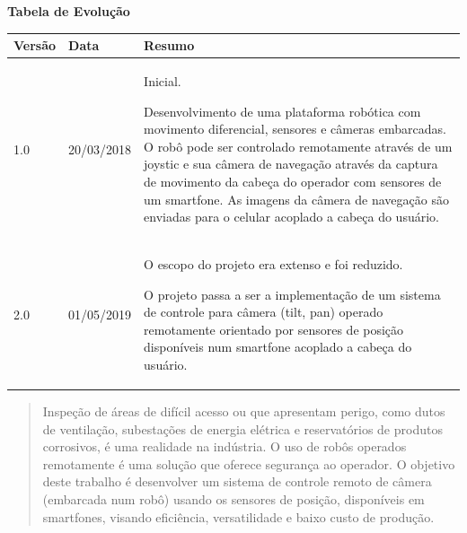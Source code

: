 \documentclass[12pt,a4paper]{article}
\begin{document}
\begin{titlepage}
\begin{center}
\Large{\bf{Tabela de Evolução}}
\end{center}

\begin{center}
    \begin{tabular}{ | l | l | p{10cm} |}
    \hline
    Versão & Data & Resumo \\ \hline
    1.0 & 20/03/2018 & Inicial.\par Desenvolvimento de uma plataforma robótica com movimento diferencial, sensores e câmeras embarcadas. O robô pode ser controlado remotamente através de um joystic e sua câmera de navegação através da captura de movimento da cabeça do operador com sensores de um smartfone. As imagens da câmera de navegação são enviadas para o celular acoplado a cabeça do usuário.\\ \hline
    2.0 & 01/05/2019 & O escopo do projeto era extenso e foi reduzido.\par O projeto passa a ser a implementação de um sistema de controle para câmera (tilt, pan) operado remotamente orientado por sensores de posição disponíveis num smartfone acoplado a cabeça do usuário. \\ \hline
    \end{tabular}
\end{center}

\end{titlepage}



\begin{abstract}
	Inspeção de áreas de difícil acesso ou que apresentam perigo, como dutos de ventilação, subestações de energia elétrica e reservatórios de produtos corrosivos, é uma realidade na indústria. O uso de robôs operados remotamente é uma solução que oferece segurança ao operador. O objetivo deste trabalho é desenvolver um sistema de controle remoto de câmera (embarcada num robô) usando os sensores de posição, disponíveis em smartfones, visando eficiência, versatilidade e baixo custo de produção.
\end{abstract}


\end{document}
